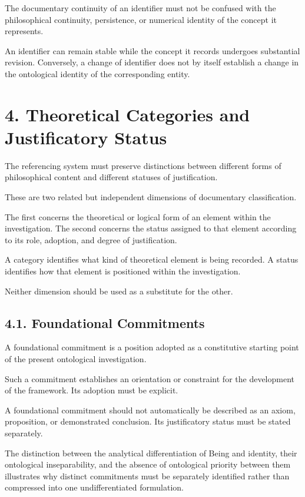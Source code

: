 The documentary continuity of an identifier must
not be confused with the philosophical continuity,
persistence, or numerical identity of the concept
it represents.

An identifier can remain stable while the concept
it records undergoes substantial revision.
Conversely, a change of identifier does not by
itself establish a change in the ontological
identity of the corresponding entity.


\section*{4. Theoretical Categories and Justificatory Status}

The referencing system must preserve distinctions
between different forms of philosophical content
and different statuses of justification.

These are two related but independent dimensions
of documentary classification.

The first concerns the theoretical or logical
form of an element within the investigation.
The second concerns the status assigned to that
element according to its role, adoption, and
degree of justification.

A category identifies what kind of theoretical
element is being recorded. A status identifies
how that element is positioned within the
investigation.

Neither dimension should be used as a substitute
for the other.

\subsection*{4.1. Foundational Commitments}

A foundational commitment is a position adopted
as a constitutive starting point of the present
ontological investigation.

Such a commitment establishes an orientation
or constraint for the development of the framework.
Its adoption must be explicit.

A foundational commitment should not automatically
be described as an axiom, proposition, or
demonstrated conclusion. Its justificatory
status must be stated separately.

The distinction between the analytical
differentiation of Being and identity, their
ontological inseparability, and the absence
of ontological priority between them illustrates
why distinct commitments must be separately
identified rather than compressed into one
undifferentiated formulation.

